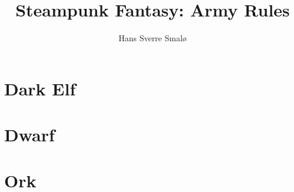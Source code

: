 \documentclass[a4,12pt, color, hyperref]{book}
\title{Steampunk Fantasy: Army Rules}
\author{Hans Sverre Smalø}
\begin{document}
\maketitle
\tableofcontents

\chapter{Dark Elf}


\chapter{Dwarf}


%

\chapter{Ork}



%
\end{document}
